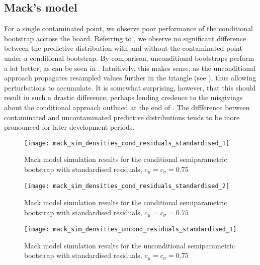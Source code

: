 \documentclass[a4paper]{book}
\begin{document}
\subsection{Mack's model}

For a single contaminated point, we observe poor performance of the conditional bootstrap accross the board. Referring to , we observe no significant difference between the predictive distribution with and without the contaminated point under a conditional bootstrap. By comparison, unconditional bootstraps perform a lot better, as can be seen in . Intuitively, this makes sense, as the unconditional approach propagates resampled values further in the triangle (see ), thus allowing perturbations to accumulate. It is somewhat surprising, however, that this should result in such a drastic difference, perhaps lending credence to the misgivings about the conditional approach outlined at the end of . The diffference between contaminated and uncontaminated predictive distributions tends to be more pronounced for later development periods.


\begin{landscape}
  \begin{figure}
    \centering
    \texttt{[image: mack\_sim\_densities\_cond\_residuals\_standardised\_1]}
    \caption{Mack model simulation results for the conditional semiparametric bootstrap with standardised residuals, $c_\mu = c_\sigma = 0.75$}
    \label{fig:mack-sim-cond-semiparam}
  \end{figure}
\end{landscape}

\begin{landscape}
  \begin{figure}
    \ContinuedFloat
    \captionsetup{list=off,format=cont}
    \centering
    \texttt{[image: mack\_sim\_densities\_cond\_residuals\_standardised\_2]}
    \caption{Mack model simulation results for the conditional semiparametric bootstrap with standardised residuals, $c_\mu = c_\sigma = 0.75$}
  \end{figure}
\end{landscape}

\begin{landscape}
  \begin{figure}
    \centering
    \texttt{[image: mack\_sim\_densities\_uncond\_residuals\_standardised\_1]}
    \caption{Mack model simulation results for the unconditional semiparametric bootstrap with standardised residuals, $c_\mu = c_\sigma = 0.75$}
    \label{fig:mack-sim-uncond-semiparam-standard}
  \end{figure}
\end{landscape}
\end{document}
